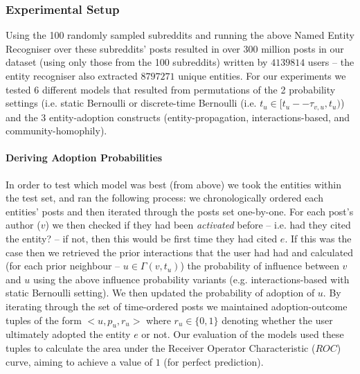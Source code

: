 \documentclass[acmsmall]{acmart}
\begin{document}
\subsubsection{Experimental Setup}
Using the 100 randomly sampled subreddits and running the above Named Entity Recogniser over these subreddits' posts resulted in over $300$ million posts in our dataset (using only those from the 100 subreddits) written by $4 139 814$ users -- the entity recogniser also extracted $8 797 271$ unique entities.
For our experiments we tested 6 different models that resulted from permutations of the 2 probability settings (i.e. static Bernoulli or discrete-time Bernoulli (i.e. $t_u \in [t_u -- \tau_{v,u}, t_u)$) and the 3 entity-adoption constructs (entity-propagation, interactions-based, and community-homophily).

\paragraph{Deriving Adoption Probabilities}
In order to test which model was best (from above) we took the entities within the test set, and ran the following process: we chronologically ordered each entities' posts and then iterated through the posts set one-by-one.
For each post's author ($v$) we then checked if they had been \emph{activated} before -- i.e. had they cited the entity? -- if not, then this would be first time they had cited $e$.
If this was the case then we retrieved the prior interactions that the user had had and calculated (for each prior neighbour -- $u \in \Gamma(v, t_u)$) the probability of influence between $v$ and $u$ using the above influence probability variants (e.g. interactions-based with static Bernoulli setting).
We then updated the probability of adoption of $u$.
By iterating through the set of time-ordered posts we maintained adoption-outcome tuples of the form $<u, p_u, r_u>$ where $r_u \in \{0,1\}$ denoting whether the user ultimately adopted the entity $e$ or not.
Our evaluation of the models used these tuples to calculate the area under the Receiver Operator Characteristic ($ROC$) curve, aiming to achieve a value of $1$ (for perfect prediction).
\end{document}
